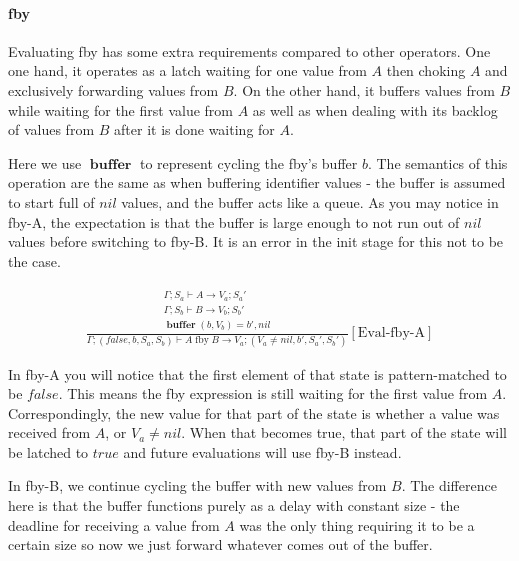 \documentclass{scrartcl}
\DeclareMathOperator{\fby}{fby}
\DeclareMathOperator{\buffer}{\mathbf{buffer}}
\begin{document}
    \paragraph{fby}
    
    Evaluating fby has some extra requirements compared to other operators. One one hand, it operates as a latch waiting for one value from $A$ then choking $A$ and exclusively forwarding values from $B$. On the other hand, it buffers values from $B$ while waiting for the first value from $A$ as well as when dealing with its backlog of values from $B$ after it is done waiting for $A$.
    
    Here we use $\buffer$ to represent cycling the fby's buffer $b$. The semantics of this operation are the same as when buffering identifier values - the buffer is assumed to start full of $nil$ values, and the buffer acts like a queue. As you may notice in fby-A, the expectation is that the buffer is large enough to not run out of $nil$ values before switching to fby-B. It is an error in the init stage for this not to be the case.
    
    \begin{align*}
    \frac{
        \begin{matrix}
        \Gamma; S_a \vdash A \rightarrow V_a; S_a' \\
        \Gamma; S_b \vdash B \rightarrow V_b; S_b' \\
        \buffer(b, V_b) = b', nil
        \end{matrix}
    }{
        \Gamma; (false, b, S_a, S_b) \vdash A \fby B \rightarrow V_a; (V_a \neq nil, b', S_a', S_b')
    }[\text{Eval-fby-A}]
    \end{align*}
    
    In fby-A you will notice that the first element of that state is pattern-matched to be $false$. This means the fby expression is still waiting for the first value from $A$. Correspondingly, the new value for that part of the state is whether a value was received from $A$, or $V_a \neq nil$. When that becomes true, that part of the state will be latched to $true$ and future evaluations will use fby-B instead.
    
    In fby-B, we continue cycling the buffer with new values from $B$. The difference here is that the buffer functions purely as a delay with constant size - the deadline for receiving a value from $A$ was the only thing requiring it to be a certain size so now we just forward whatever comes out of the buffer.
    
\end{document}

